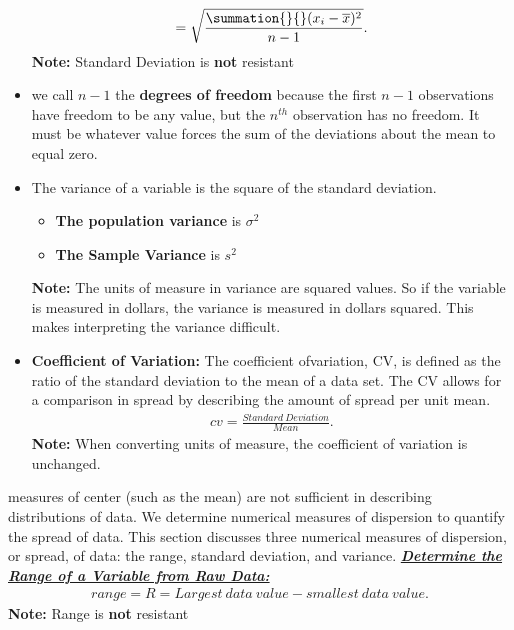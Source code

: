 \documentclass{report}
\begin{document}
\begin{itemize}
\begin{align*}
                    = \sqrt{\frac{\summation{}{}(x_{i}-\overline{x})^{2}}{n-1}}
                .\end{align*}
                \textbf{Note:} Standard Deviation is \textbf{not} resistant
            \item  we call $n-1$ the \textbf{degrees of freedom} because the first $n-1 $  observations have freedom to be any value, but the $n^{th}$ observation has no freedom. It must be whatever value forces the sum of the deviations about the mean to equal zero.
            \item The variance of a variable is the square of the standard deviation.
                \begin{itemize}
                    \item  \textbf{The population variance} is \textbf{$\sigma^{2}$} 
                    \item \textbf{The Sample Variance} is $s^{2}$
                \end{itemize}
                \textbf{Note:} The units of measure in variance are squared values. So if the variable is measured in dollars, the variance is measured in dollars squared. This makes interpreting the variance difficult.
            \item \textbf{Coefficient of Variation:} The coefficient of​ variation, CV, is defined as the ratio of the standard deviation to the mean of a data set. The CV allows for a comparison in spread by describing the amount of spread per unit mean.
                \begin{align*}
                    cv = \frac{Standard\ Deviation}{Mean}
                .\end{align*}
            \textbf{Note:} When converting units of​ measure, the coefficient of variation is unchanged.
        \end{itemize}
        \bigbreak \noindent 
        measures of center (such as the mean) are not sufficient in describing distributions of data. We determine numerical measures of dispersion to quantify the spread of data. This section discusses three numerical measures of dispersion, or spread, of data: the range, standard deviation, and variance.
        \bigbreak \noindent \bigbreak \noindent 
        \textbf{\textit{\underline{Determine the Range of a Variable from Raw Data:}}}
        \begin{align*}
            range = R = Largest\ data\ value- smallest\ data\ value
        .\end{align*}
        \bigbreak \noindent 
        \textbf{Note:} Range is \textbf{not} resistant
\end{document}
